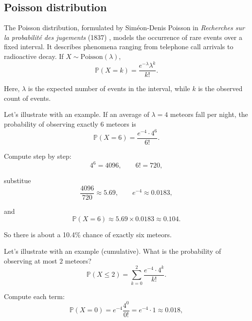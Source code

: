 \documentclass{book}
\begin{document}
\subsection*{Poisson distribution}

The Poisson distribution, formulated by Siméon-Denis Poisson in \emph{Recherches sur la probabilité des jugements} (1837) \cite{poisson-judgements}, models the occurrence of rare events over a fixed interval. It describes phenomena ranging from telephone call arrivals to radioactive decay. If $X \sim \text{Poisson}(\lambda)$,
\begin{equation}
	\mathbb{P}(X = k) = \frac{e^{-\lambda} \lambda^k}{k!}.
	\label{eq:poisson1}
\end{equation}

Here, $\lambda$ is the expected number of events in the interval, while $k$ is the observed count of events.

\medskip

Let's illustrate with an example. If an average of $\lambda=4$ meteors fall per night, the probability of observing exactly $6$ meteors is
\begin{equation}
	\mathbb{P}(X=6) = \frac{e^{-4} \cdot 4^6}{6!}.
\end{equation}

Compute step by step:
\begin{equation}
	4^6 = 4096, \qquad 6! = 720,
\end{equation}

substitue
\begin{equation}
	\frac{4096}{720} \approx 5.69, \qquad e^{-4} \approx 0.0183,
\end{equation}

and
\begin{equation}
	\mathbb{P}(X=6) \approx 5.69 \times 0.0183 \approx 0.104.
\end{equation}

So there is about a 10.4\% chance of exactly six meteors.

\medskip

Let's illustrate with an example (cumulative). What is the probability of observing at most $2$ meteors?
\begin{equation}
	\mathbb{P}(X \leq 2) = \sum_{k=0}^2 \frac{e^{-4} \cdot 4^k}{k!}.
\end{equation}

Compute each term:
\begin{equation}
	\mathbb{P}(X=0) = e^{-4} \frac{4^0}{0!} = e^{-4} \cdot 1 \approx 0.018,
\end{equation}
\end{document}
